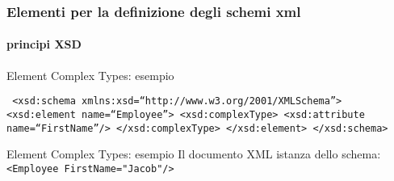 \begin{frame}
    \frametitle{Elementi per la definizione degli schemi xml}
    \framesubtitle{principi XSD}
    \addtocounter{nframe}{1}

    \begin{block}{Element Complex Types: esempio}
         
        \texttt{
            <xsd:schema xmlns:xsd=``http://www.w3.org/2001/XMLSchema''>
            <xsd:element name=``Employee''>
                <xsd:complexType>
                    <xsd:attribute name=``FirstName''/>
                </xsd:complexType>
            </xsd:element>
            </xsd:schema>
        }
    \end{block}

    \begin{block}{Element Complex Types: esempio}
         Il documento XML istanza dello schema: 
         \\\texttt{<Employee FirstName="Jacob"/>}
    \end{block}
    
\end{frame}
